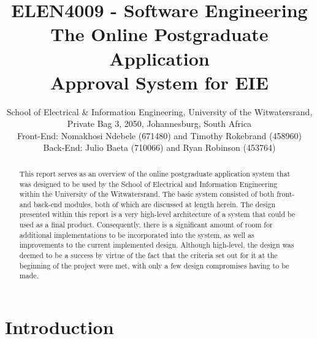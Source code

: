 \documentclass[journal]{IEEEtran}
\begin{document}
\title{ELEN4009 - Software Engineering\\ The Online Postgraduate Application\\ Approval System for EIE}

\author{\vspace{2mm} \small School of Electrical \& Information Engineering, University of the Witwatersrand, Private Bag 3, 2050, Johannesburg, South Africa \vspace{1mm} \\ \normalsize Front-End: Nomakhosi Ndebele (671480) and Timothy Rokebrand (458960) \\ Back-End: Julio Baeta (710066) and Ryan Robinson (453764)
}

\markboth{}{}

\maketitle


\thispagestyle{fancy}

\begin{abstract}

This report serves as an overview of the online postgraduate application system that was designed to be used by the School of Electrical and Information Engineering within the University of the Witwatersrand. The basic system consisted of both front- and back-end modules, both of which are discussed at length herein. The design presented within this report is a very high-level architecture of a system that could be used as a final product. Consequently, there is a significant amount of room for additional implementations to be incorporated into the system, as well as improvements to the current implemented design. Although high-level, the design was deemed to be a success by virtue of the fact that the criteria set out for it at the beginning of the project were met, with only a few design compromises having to be made.

\end{abstract}

\IEEEpeerreviewmaketitle


\section{Introduction}
\end{document}
